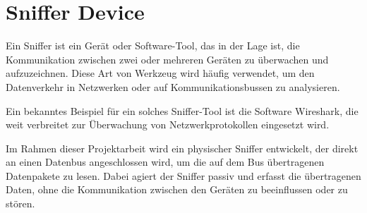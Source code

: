 



\section{Sniffer Device}



Ein Sniffer ist ein Gerät oder Software-Tool, das in der Lage ist, die Kommunikation zwischen zwei oder mehreren Geräten zu überwachen und aufzuzeichnen. Diese Art von Werkzeug wird häufig verwendet, um den Datenverkehr in Netzwerken oder auf Kommunikationsbussen zu analysieren.

Ein bekanntes Beispiel für ein solches Sniffer-Tool ist die Software Wireshark, die weit verbreitet zur Überwachung von Netzwerkprotokollen eingesetzt wird.

Im Rahmen dieser Projektarbeit wird ein physischer Sniffer entwickelt, der direkt an einen Datenbus angeschlossen wird, um die auf dem Bus übertragenen Datenpakete zu lesen. Dabei agiert der Sniffer passiv und erfasst die übertragenen Daten, ohne die Kommunikation zwischen den Geräten zu beeinflussen oder zu stören.


